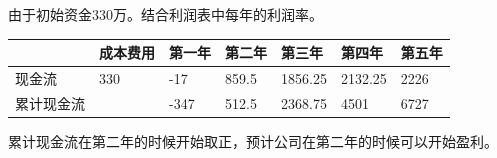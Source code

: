 \documentclass[UTF8]{ctexart}
\begin{document}
由于初始资金330万。结合利润表中每年的利润率。
\begin{table}[H]
	\centering
	\begin{tabular}{|l|l|l|l|l|l|l|}
	\hline
		  & 成本费用 & 第一年  & 第二年   & 第三年     & 第四年     & 第五年  \\ \hline
	现金流   & 330  & -17  & 859.5 & 1856.25 & 2132.25 & 2226 \\ \hline
	累计现金流 &      & -347 & 512.5 & 2368.75 & 4501    & 6727 \\ \hline
	\end{tabular}
	\end{table}
	累计现金流在第二年的时候开始取正，预计公司在第二年的时候可以开始盈利。
\end{document}

